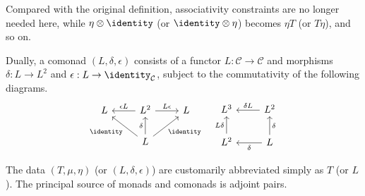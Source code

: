 Compared with the original definition, associativity constraints are no
longer needed here, while $\eta\otimes\identity$ (or
$\identity\otimes\eta$) becomes $\eta T$ (or $T\eta$), and so on.

Dually, a comonad $(L,\delta,\epsilon)$ consists of a functor
$L:\mathcal{C}\to\mathcal{C}$ and morphisms $\delta:L\to L^2$ and
$\epsilon:L\to\identity_{\mathcal{C}}$, subject to the commutativity of the
following diagrams.
\begin{equation*}\begin{gathered}
	\begin{tikzcd}
		L  & L^2 \arrow[l, "{\epsilon L}"'] \arrow[r, "{L\epsilon}"] & L \\
		& L \arrow[lu, "\identity"] \arrow[ru, "\identity"'] \arrow[u, "\delta"] &
	\end{tikzcd} \quad
	\begin{tikzcd}
		L^3 & L^2 \arrow[l, "\delta L"'] \\
		L^2 \arrow[u, "L\delta"] & L \arrow[u, "\delta"'] \arrow[l, "\delta"]
	\end{tikzcd}
\end{gathered}\end{equation*}

The data $(T,\mu,\eta)$ (or $(L,\delta,\epsilon)$) are customarily
abbreviated simply as $T$ (or $L$). The principal source of monads and
comonads is adjoint pairs.

